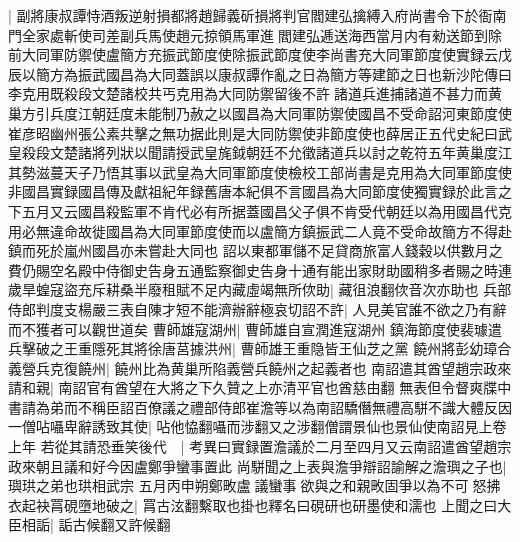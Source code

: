 |{
	副將康叔譚恃酒叛逆射損都將趙歸義斫損將判官閻建弘擒縛入府尚書令下於衙南門全家處斬使司差副兵馬使趙元掠領馬軍進閻建弘逓送海西當月内有勑送節到除前大同軍防禦使盧簡方充振武節度使除振武節度使李尚書充大同軍節度使實録云戊辰以簡方為振武國昌為大同蓋誤以康叔譚作亂之日為簡方等建節之日也新沙陀傳曰李克用既殺段文楚諸校共丐克用為大同防禦留後不許諸道兵進捕諸道不甚力而黄巢方引兵度江朝廷度未能制乃赦之以國昌為大同軍防禦使國昌不受命詔河東節度使崔彦昭幽州張公素共擊之無功据此則是大同防禦使非節度使也薛居正五代史紀曰武皇殺段文楚諸將列狀以聞請授武皇旄鉞朝廷不允徵諸道兵以討之乾符五年黄巢度江其勢滋蔓天子乃悟其事以武皇為大同軍節度使檢校工部尚書是克用為大同軍節度使非國昌實録國昌傳及獻祖紀年録舊唐本紀俱不言國昌為大同節度使獨實録於此言之下五月又云國昌殺監軍不肯代必有所据蓋國昌父子俱不肯受代朝廷以為用國昌代克用必無違命故徙國昌為大同軍節度使而以盧簡方鎮振武二人竟不受命故簡方不得赴鎮而死於嵐州國昌亦未嘗赴大同也}
詔以東都軍儲不足貸商旅富人錢穀以供數月之費仍賜空名殿中侍御史告身五通監察御史告身十通有能出家財助國稍多者賜之時連歲旱蝗寇盜充斥耕桑半廢租賦不足内藏虛竭無所佽助|{
	藏徂浪翻佽音次亦助也}
兵部侍郎判度支楊嚴三表自陳才短不能濟辦辭極哀切詔不許|{
	人見美官誰不欲之乃有辭而不獲者可以觀世道矣}
曹師雄寇湖州|{
	曹師雄自宣潤進寇湖州}
鎮海節度使裴璩遣兵擊破之王重隱死其將徐唐莒據洪州|{
	曹師雄王重隐皆王仙芝之黨}
饒州將彭幼璋合義營兵克復饒州|{
	饒州比為黄巢所陷義營兵饒州之起義者也}
南詔遣其酋望趙宗政來請和親|{
	南詔官有酋望在大將之下久贊之上亦清平官也酋慈由翻}
無表但令督爽牒中書請為弟而不稱臣詔百僚議之禮部侍郎崔澹等以為南詔驕僭無禮高駢不識大體反因一僧呫囁卑辭誘致其使|{
	呫他恊翻囁而涉翻又之涉翻僧謂景仙也景仙使南詔見上卷上年}
若從其請恐垂笑後代　|{
	考異曰實録置澹議於二月至四月又云南詔遣酋望趙宗政來朝且議和好今因盧鄭爭蠻事置此}
尚駢聞之上表與澹爭辯詔諭解之澹璵之子也|{
	璵珙之弟也珙相武宗}
五月丙申朔鄭畋盧議蠻事欲與之和親畋固爭以為不可怒拂衣起袂罥硯墮地破之|{
	罥古泫翻繫取也掛也釋名曰硯研也研墨使和濡也}
上聞之曰大臣相詬|{
	詬古候翻又許候翻}
